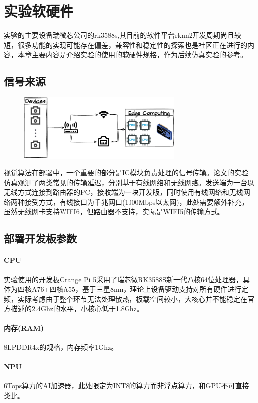 \documentclass[master,anonymous]{shtthesis}
\begin{document}
\section{实验软硬件}
实验的主要设备瑞微芯公司的rk3588s,其目前的软件平台rknn2开发周期尚且较短，很多功能的实现可能存在偏差，兼容性和稳定性的探索也是社区正在进行的内容，本章主要内容是介绍实验的使用的软硬件规格，作为后续仿真实验的参考。

\subsection{信号来源}
\begin{figure}[htbp]
	\centering
	\includegraphics[width=8cm]{img/sim.pdf}
	\label{实验仿真的传输场景}
\end{figure}
视觉算法在部署中，一个重要的部分是IO模块负责处理的信号传输。论文的实验仿真观测了两类常见的传输延迟，分别基于有线网络和无线网络。发送端为一台以无线方式连接到路由器的PC，接收端为一块开发版，同时使用有线网络和无线网络两种接受方式，有线接口为千兆网口(1000Mbps以太网)，此处需要额外补充，虽然无线网卡支持WIFI6，但路由器不支持，实际是WIFI5的传输方式。

\subsection{部署开发板参数}

\paragraph{CPU}实验使用的开发板Orange Pi 5采用了瑞芯微RK3588S新一代八核64位处理器，具体为四核A76+四核A55，基于三星8nm，理论上设备驱动支持对所有硬件进行定频，实际考虑由于整个环节无法处理散热，板载空间较小，大核心并不能稳定在官方描述的2.4Ghz的水平，小核心低于1.8Ghz。

\paragraph{内存(RAM)}8LPDDR4x的规格，内存频率1Ghz。

\paragraph{NPU}6Tops算力的AI加速器，此处限定为INT8的算力而非浮点算力，和GPU不可直接类比。
\end{document}
